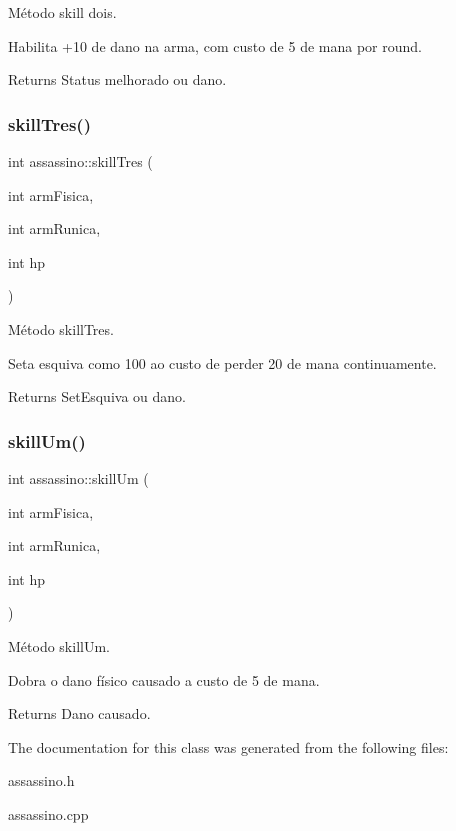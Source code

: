 Método skill dois. 

Habilita +10 de dano na arma, com custo de 5 de mana por round. \begin{DoxyReturn}{Returns}
Status melhorado ou dano. 
\end{DoxyReturn}
\mbox{\label{classassassino_ad13d3c24ad8f2f3e0c7274a1a18a0d39}} 
\subsubsection{\texorpdfstring{skill\+Tres()}{skillTres()}}
{\footnotesize\ttfamily int assassino\+::skill\+Tres (\begin{DoxyParamCaption}\item[{int}]{arm\+Fisica,  }\item[{int}]{arm\+Runica,  }\item[{int}]{hp }\end{DoxyParamCaption})}



Método skill\+Tres. 

Seta esquiva como 100 ao custo de perder 20 de mana continuamente. \begin{DoxyReturn}{Returns}
Set\+Esquiva ou dano. 
\end{DoxyReturn}
\mbox{\label{classassassino_a02ee2eea7a7f1ca7ca8d1b88e481ab97}} 
\subsubsection{\texorpdfstring{skill\+Um()}{skillUm()}}
{\footnotesize\ttfamily int assassino\+::skill\+Um (\begin{DoxyParamCaption}\item[{int}]{arm\+Fisica,  }\item[{int}]{arm\+Runica,  }\item[{int}]{hp }\end{DoxyParamCaption})}



Método skill\+Um. 

Dobra o dano físico causado a custo de 5 de mana. \begin{DoxyReturn}{Returns}
Dano causado. 
\end{DoxyReturn}


The documentation for this class was generated from the following files\+:\begin{DoxyCompactItemize}
\item 
assassino.\+h\item 
assassino.\+cpp\end{DoxyCompactItemize}
